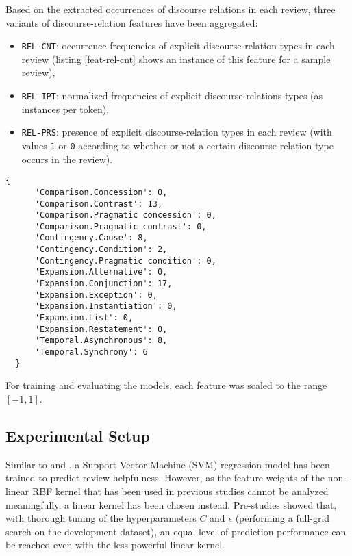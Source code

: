 \documentclass[
    a4paper,%
    12pt,%
    oneside,%
    toc=bibliography,
    final,
]{scrartcl}
\begin{document}
Based on the extracted occurrences of discourse relations in each review, three variants of discourse-relation features have been aggregated:

\begin{itemize}
\item \lstinline|REL-CNT|: occurrence frequencies of explicit discourse-relation types in each review (listing \ref{feat-rel-cnt} shows an instance of this feature for a sample review),
\item \lstinline|REL-IPT|: normalized frequencies of explicit discourse-relations types (as instances per token),
\item \lstinline|REL-PRS|: presence of explicit discourse-relation types in each review (with values \lstinline|1| or \lstinline|0| according to whether or not a certain discourse-relation type occurs in the review).
\end{itemize}

\begin{lstlisting}[caption=\texttt{REL-CNT} feature for a sample review., label=feat-rel-cnt, basicstyle=\ttfamily\small\singlespacing]
  {
      'Comparison.Concession': 0,
      'Comparison.Contrast': 13,
      'Comparison.Pragmatic concession': 0,
      'Comparison.Pragmatic contrast': 0,
      'Contingency.Cause': 8,
      'Contingency.Condition': 2,
      'Contingency.Pragmatic condition': 0,
      'Expansion.Alternative': 0,
      'Expansion.Conjunction': 17,
      'Expansion.Exception': 0,
      'Expansion.Instantiation': 0,
      'Expansion.List': 0,
      'Expansion.Restatement': 0,
      'Temporal.Asynchronous': 8,
      'Temporal.Synchrony': 6
  }
\end{lstlisting}

For training and evaluating the models, each feature was scaled to the range $ [-1, 1] $.


\subsection{Experimental Setup}

Similar to \citet{Kim2006} and \citet{Golly2017}, a Support Vector Machine (SVM) regression model has been trained to predict review helpfulness. However, as the feature weights of the non-linear RBF kernel that has been used in previous studies cannot be analyzed meaningfully, a linear kernel has been chosen instead. Pre-studies showed that, with thorough tuning of the hyperparameters $ C $ and $ \epsilon $ (performing a full-grid search on the development dataset), an equal level of prediction performance can be reached even with the less powerful linear kernel.
\end{document}
